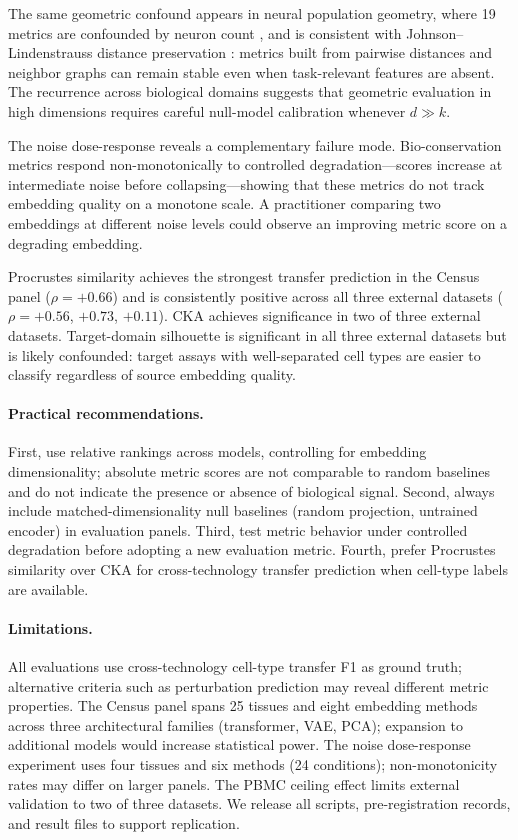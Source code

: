 \documentclass[11pt]{article}
\begin{document}
The same geometric confound appears in neural population geometry, where
19 metrics are confounded by neuron count \citep{tower2026bracket}, and
is consistent with Johnson--Lindenstrauss distance preservation
\citep{johnsonlindenstrauss1984}: metrics built from pairwise distances
and neighbor graphs can remain stable even when task-relevant features
are absent. The recurrence across biological domains suggests that
geometric evaluation in high dimensions requires careful null-model
calibration whenever $d \gg k$.

The noise dose-response reveals a complementary failure mode.
Bio-conservation metrics respond non-monotonically to controlled
degradation---scores increase at intermediate noise before
collapsing---showing that these metrics do not track embedding quality
on a monotone scale. A practitioner comparing two embeddings at
different noise levels could observe an improving metric score on a
degrading embedding.

Procrustes similarity achieves the strongest transfer prediction in the
Census panel ($\rho = +0.66$) and is consistently positive across all
three external datasets ($\rho = +0.56$, $+0.73$, $+0.11$). CKA
achieves significance in two of three external datasets. Target-domain
silhouette is significant in all three external datasets but is likely
confounded: target assays with well-separated cell types are easier to
classify regardless of source embedding quality.

\paragraph{Practical recommendations.} First, use relative rankings
across models, controlling for embedding dimensionality; absolute metric
scores are not comparable to random baselines and do not indicate the
presence or absence of biological signal. Second, always include
matched-dimensionality null baselines (random projection, untrained
encoder) in evaluation panels. Third, test metric behavior under
controlled degradation before adopting a new evaluation metric. Fourth,
prefer Procrustes similarity over CKA for cross-technology transfer
prediction when cell-type labels are available.

\paragraph{Limitations.} All evaluations use cross-technology cell-type
transfer F1 as ground truth; alternative criteria such as perturbation
prediction may reveal different metric properties. The Census panel
spans 25 tissues and eight embedding methods across three architectural
families (transformer, VAE, PCA); expansion to additional models would
increase statistical power. The noise dose-response experiment uses four
tissues and six methods (24 conditions); non-monotonicity rates may
differ on larger panels. The PBMC ceiling effect limits external
validation to two of three datasets. We release all scripts,
pre-registration records, and result files to support replication.
\end{document}
